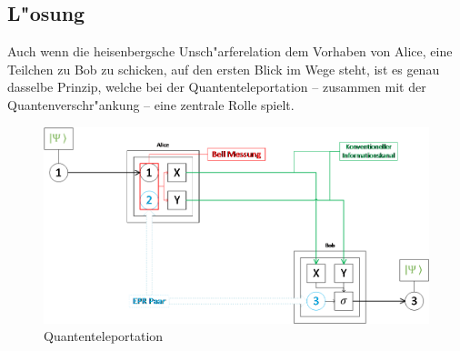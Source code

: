 \begin{refsection}
\section{L"osung}
Auch wenn die heisenbergsche Unsch"arferelation dem Vorhaben von Alice, eine Teilchen zu Bob zu schicken, auf den ersten Blick im Wege steht, ist es genau dasselbe Prinzip, welche bei der Quantenteleportation – zusammen mit der Quantenverschr"ankung – eine zentrale Rolle spielt.
\begin{figure}
	\center
	\includegraphics[width=1\textwidth]{teleport/image/quantum_teleportation.png}
	\caption{Quantenteleportation}
	\label{Quantenteleportation}
\end{figure}


\end{refsection}
